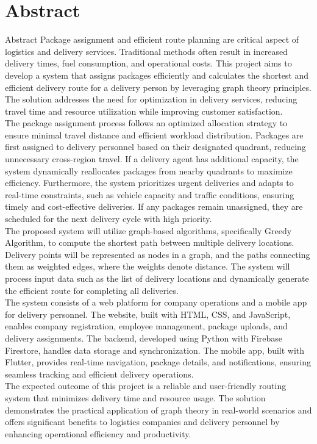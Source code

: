\newpage
\thispagestyle{empty}
\chapter*{Abstract}
{\numberline{}Abstract}%
Package assignment and efficient route planning are critical aspect of logistics and delivery services. Traditional 
methods often result in increased delivery times, fuel consumption, and operational costs. This project aims to develop a system that assigns packages efficiently and calculates the shortest and efficient delivery route for a delivery person by leveraging graph theory principles. The solution addresses the need for optimization in delivery services, reducing travel time and resource utilization while improving customer satisfaction. 
\\
The package assignment process follows an optimized allocation strategy to ensure minimal travel distance and efficient workload distribution. Packages are first assigned to delivery personnel based on their designated quadrant, reducing unnecessary cross-region travel. If a delivery agent has additional capacity, the system dynamically reallocates packages from nearby quadrants to maximize efficiency. Furthermore, the system prioritizes urgent deliveries and adapts to real-time constraints, such as vehicle capacity and traffic conditions, ensuring timely and cost-effective deliveries. If any packages remain unassigned, they are scheduled for the next delivery cycle with high priority.
\\
The proposed system will utilize graph-based algorithms, specifically Greedy Algorithm, to compute the shortest path between multiple delivery locations. Delivery points will be represented as nodes in a graph, and the paths connecting them as weighted edges, where the weights denote distance. The system will 
process input data such as the list of delivery locations and dynamically generate the efficient route for completing all deliveries.
\\
The system consists of a web platform for company operations and a mobile app for delivery personnel. The website, built with HTML, CSS, and JavaScript, enables company registration, employee management, package uploads, and delivery assignments. The backend, developed using Python with Firebase Firestore, handles data storage and synchronization. The mobile app, built with Flutter, provides real-time navigation, package details, and notifications, ensuring seamless tracking and efficient delivery operations.
\\
The expected outcome of this project is a reliable and user-friendly routing system that 
minimizes delivery time and resource usage. The solution demonstrates the practical 
application of graph theory in real-world scenarios and offers significant benefits to logistics 
companies and delivery personnel by enhancing operational efficiency and productivity. 